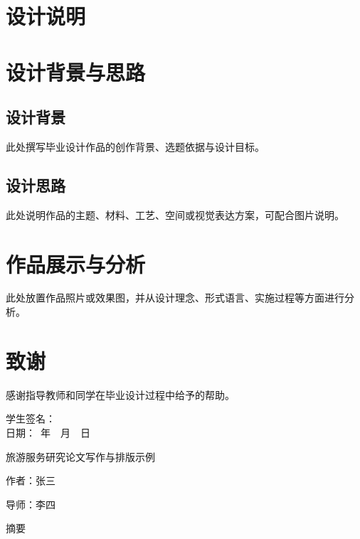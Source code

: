 \documentclass[\HNTcategory]{hntouthesis}
\renewcommand{\hnttitle}{单片机在测温技术中的应用}
\renewcommand{\hntauthor}{张\quad 三}
\renewcommand{\hntadvisor}{李\quad 四}
\renewcommand{\hnttitle}{外语研究论文写作与排版示例}
\renewcommand{\hnttitle}{毕业设计说明书与作品图版示例}
\renewcommand{\hnttitle}{旅游服务研究论文写作与排版示例}
\begin{document}
\ifhntforeign
  \linespread{1.52}\selectfont
\else
  \linespread{1.38}\selectfont
\fi
\setlength{\parindent}{2em}
\setlength{\parskip}{0pt}

\makehntcover
\makehntinnercover
\ifhntforeign\makehntengcover\fi
\hntbodylayout

\ifhntforeign

\else
\ifhntart
\newpage
{}
\pagestyle{hntmain}
\section*{设计说明}
\section{设计背景与思路}
\subsection{设计背景}
此处撰写毕业设计作品的创作背景、选题依据与设计目标。

\subsection{设计思路}
此处说明作品的主题、材料、工艺、空间或视觉表达方案，可配合图片说明。

\section{作品展示与分析}
此处放置作品照片或效果图，并从设计理念、形式语言、实施过程等方面进行分析。


\newpage
\section*{致\quad 谢}
感谢指导教师和同学在毕业设计过程中给予的帮助。

\vspace{2cm}
\begin{flushright}
学生签名：\underline{\makebox[3cm]{}}\\[1.2em]
日\quad 期：\underline{\makebox[3cm]{}}\ 年\ \underline{\makebox[1cm]{}}\ 月\ \underline{\makebox[1cm]{}}\ 日
\end{flushright}
\else
\newpage
\pagestyle{hntfront}
\begin{center}
{\hei{} \hnttitle}
\end{center}
\vspace{0.4em}
{\song{}\hfill 作者：\hntauthor\par}
{\song{}\hfill 导师：\hntadvisor\par}
\vspace{0.8em}
\begin{center}
{\hei{} 摘\quad 要}
\end{center}
\vspace{0.4em}
\end{document}
